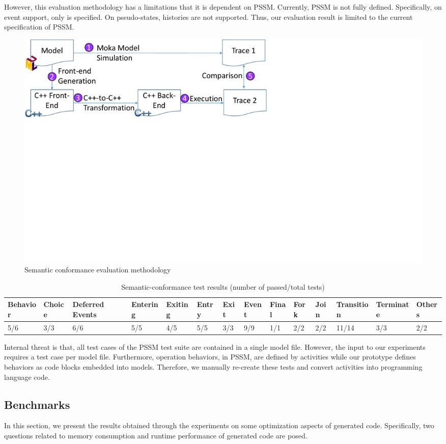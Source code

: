 However, this evaluation methodology has a limitations that it is dependent on PSSM.
Currently, PSSM is not fully defined.
Specifically, on event support, only  is specified.
On pseudo-states, histories are not supported.
Thus, our evaluation result is limited to the current specification of PSSM.

\begin{figure}
	\centering
	\includegraphics[clip, trim=0.2cm 8.6cm 16.7cm 6.9cm, width=0.7\columnwidth]{figures/semanticconformance.pdf}
	\caption{Semantic conformance evaluation methodology} 
	\label{fig:semanticconformance}
\end{figure}		


\begin{table}[]
	\centering
	\caption{Semantic-conformance test results (number of passed/total tests)}
	\label{table:semantic-test}
	\begin{tabular}{|l|l|l|l|l|l|l|l|l|l|l|l|l|l|}
		\hline
		Behavior & Choice & Deferred Events & Entering & Exiting & Entry & Exit & Event & Final & Fork & Join & Transition & Terminate & Others \\ \hline
		5/6&        3/3&         6/6        &    5/5      &    4/5     &  5/5     &   3/3   &    9/9    &   1/1    &   2/2   &   2/2   &      11/14      &    3/3       &    2/2    \\ \hline
	\end{tabular}
\end{table}

\noindent
{}
Internal threat is that, all test cases of the PSSM test suite are contained in a single model file.
However, the input to our experiments requires a test case per model file.
Furthermore, operation behaviors, in PSSM, are defined by activities while our prototype defines behaviors as code blocks embedded into models.
Therefore, we manually re-create these tests and convert activities into programming language code.

\subsection{Benchmarks}
\label{subsec:exp2}
In this section, we present the results obtained through the experiments on some optimization aspects of generated code. 
Specifically, two questions related to memory consumption and runtime performance of generated code are posed. 

